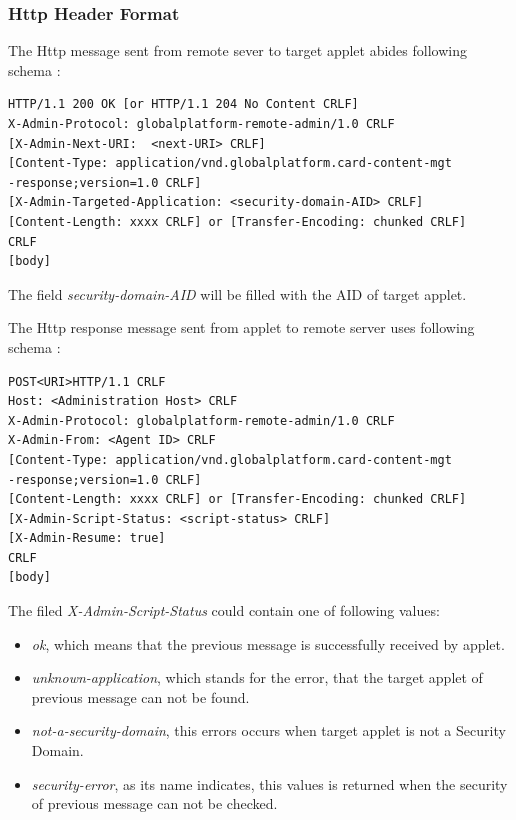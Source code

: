 \subsubsection{Http Header Format} \label{secHTTPHeader} \label{secHttpHeader}
The Http message sent from remote sever to target applet abides following schema \cite{gp}:
\begin{Verbatim}[fontsize=\relsize{-1}, frame=lines,framesep=4mm, label=\fbox{\small\emph{Http Request Schema}}]
HTTP/1.1 200 OK [or HTTP/1.1 204 No Content CRLF]
X-Admin-Protocol: globalplatform-remote-admin/1.0 CRLF
[X-Admin-Next-URI:  <next-URI> CRLF]
[Content-Type: application/vnd.globalplatform.card-content-mgt
-response;version=1.0 CRLF]
[X-Admin-Targeted-Application: <security-domain-AID> CRLF]
[Content-Length: xxxx CRLF] or [Transfer-Encoding: chunked CRLF]
CRLF
[body]
\end{Verbatim}
The field \emph{security-domain-AID} will be filled with the AID of target applet.


The Http response message sent from applet to remote server uses following schema \cite{gp}:
\begin{Verbatim}[fontsize=\relsize{-1}, frame=lines,framesep=4mm, label=\fbox{\small\emph{Http Response Schema}}]
POST<URI>HTTP/1.1 CRLF
Host: <Administration Host> CRLF
X-Admin-Protocol: globalplatform-remote-admin/1.0 CRLF
X-Admin-From: <Agent ID> CRLF
[Content-Type: application/vnd.globalplatform.card-content-mgt
-response;version=1.0 CRLF]
[Content-Length: xxxx CRLF] or [Transfer-Encoding: chunked CRLF]
[X-Admin-Script-Status: <script-status> CRLF]
[X-Admin-Resume: true]
CRLF
[body]
\end{Verbatim}

The filed \emph{X-Admin-Script-Status} could contain one of following values:
 \begin{itemize}
  \item \emph{ok}, which means that the previous message is successfully received by applet.
  \item \emph{unknown-application}, which stands for the error, that the target applet of previous message can not be found.
\item \emph{not-a-security-domain}, this errors occurs when target applet is not a Security Domain.
\item \emph{security-error}, as its name indicates, this values is returned when the security of previous message can not be checked.
\end{itemize}

